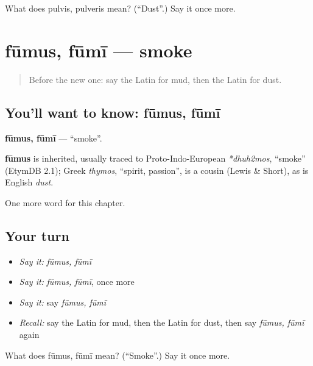 \begin{tcolorbox}[breakable,colback=teal!4,colframe=teal!35!black,title={Before you move on}]
What does pulvis, pulveris mean? (\textquotedblleft{}Dust\textquotedblright{}.) Say it once more.
\end{tcolorbox}
\section[fūmus, fūmī]{fūmus, fūmī — smoke}

\label{lesson:LA-C275-fumus}



\begin{quote}
Before the new one: say the Latin for mud, then the Latin for dust.
\end{quote}

\subsection*{You'll want to know: fūmus, fūmī}
\textbf{fūmus, fūmī} — \textquotedblleft{}smoke\textquotedblright{}.

\begin{cousinweb}
\textbf{fūmus} is inherited, usually traced to Proto-Indo-European \emph{*dhuh2mos}, \textquotedblleft{}smoke\textquotedblright{} (EtymDB 2.1); Greek \emph{thymos}, \textquotedblleft{}spirit, passion\textquotedblright{}, is a cousin (Lewis \& Short), as is English \emph{dust}.
\end{cousinweb}

\begin{grammarlens}[title={What you've built}]
One more word for this chapter.
\end{grammarlens}

\subsection*{Your turn}
\begin{itemize}
\raggedright
  \item \emph{Say it:} \emph{fūmus, fūmī}
  \item \emph{Say it:} \emph{fūmus, fūmī}, once more
  \item \emph{Say it:} say \emph{fūmus, fūmī}
  \item \emph{Recall:} say the Latin for mud, then the Latin for dust, then say \emph{fūmus, fūmī} again
\end{itemize}

\begin{tcolorbox}[breakable,colback=teal!4,colframe=teal!35!black,title={Before you move on}]
What does fūmus, fūmī mean? (\textquotedblleft{}Smoke\textquotedblright{}.) Say it once more.
\end{tcolorbox}
